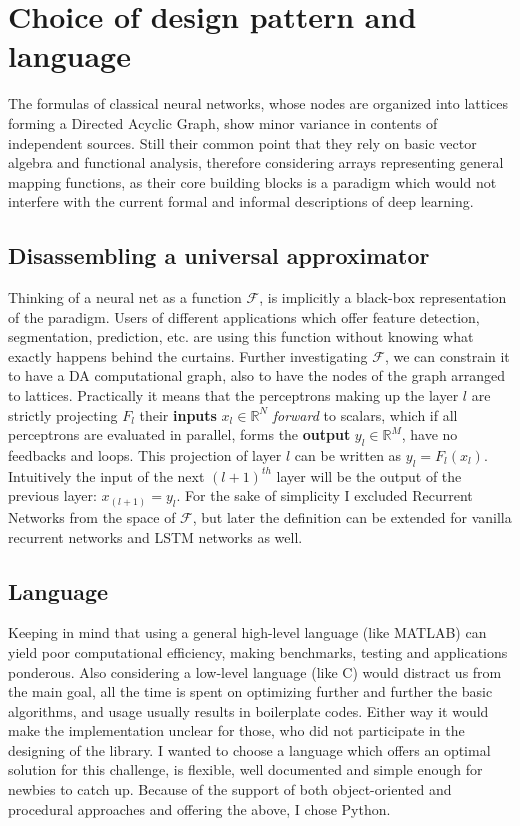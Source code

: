 \section{Choice of design pattern and language}

The formulas of classical neural networks, whose nodes are organized into
 lattices forming a Directed Acyclic Graph, show minor variance in
 contents of independent sources. Still their common point that they rely
 on basic vector algebra and functional analysis, therefore considering
 arrays representing general mapping functions, as their core building
 blocks is a paradigm which would not interfere with the current formal
 and informal descriptions of deep learning.

\subsection{Disassembling a universal approximator}
Thinking of a neural net as a function \(\mathcal{F}\), is implicitly a black-box representation of the paradigm.
Users of different applications which offer feature detection, segmentation, prediction, etc. are using this function without knowing what exactly happens behind the curtains. 
Further investigating $\mathcal{F}$, we can constrain it to have a DA computational graph, also to have the nodes of the graph arranged to lattices.
Practically it means that the perceptrons making up the layer \(l\) are strictly projecting $F_l$ their \textbf{inputs} 
$ x_l \in \mathbb{R}^N $ \emph{forward} to scalars, which if all perceptrons are evaluated in parallel, forms the 
\textbf{output} $y_l \in \mathbb{R}^M$, have no feedbacks and loops. 
This projection of layer $l$ can be written as $y_l = F_l(x_l)$. 
Intuitively the input of the next $(l+1)^{th}$ layer will be the output of the previous layer:
$x_{(l+1)} = y_l$.
For the sake of simplicity I excluded Recurrent Networks from the space of $\mathcal{F}$, but later the definition can be extended for vanilla recurrent networks and LSTM networks as well.

\subsection{Language} Keeping in mind that using a general high-level language (like MATLAB) can yield poor computational efficiency, making benchmarks, testing and applications ponderous.
Also considering a low-level language (like C) 
would distract us from the main goal, all 
the time is spent on optimizing further and 
further the basic algorithms, and usage usually 
results in boilerplate codes. 
Either way it would make the implementation unclear for those, who did not participate in the designing of the library.
I wanted to choose a language which offers an optimal solution for this challenge, is flexible, well documented and simple enough for newbies to catch up.
Because of the support of both object-oriented and procedural approaches and offering the above, I chose Python.

